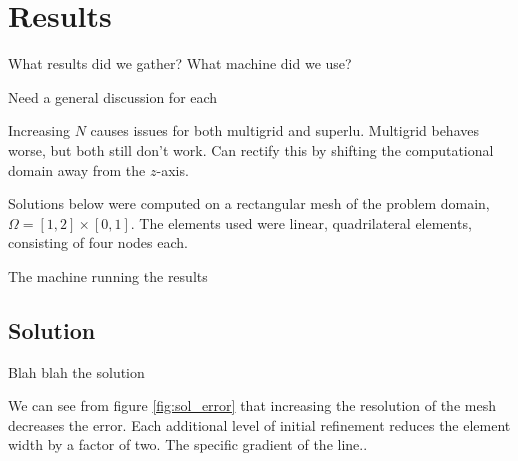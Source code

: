 \chapter{Results}

\def\figwidth{0.7\columnwidth}


What results did we gather?
What machine did we use?

Need a general discussion for each

Increasing $N$ causes issues for both multigrid and superlu.
Multigrid behaves worse, but both still don't work.
Can rectify this by shifting the computational domain away from the $z$-axis.


Solutions below were computed on a rectangular mesh of the problem domain, $\Omega = [1,2]\times [0,1]$.
The elements used were linear, quadrilateral elements, consisting of four nodes each.

The machine running the results




\section{Solution}



Blah blah the solution

We can see from figure \ref{fig:sol_error} that increasing the resolution of the mesh decreases the error.
Each additional level of initial refinement reduces the element width by a factor of two.
The specific gradient of the line..


